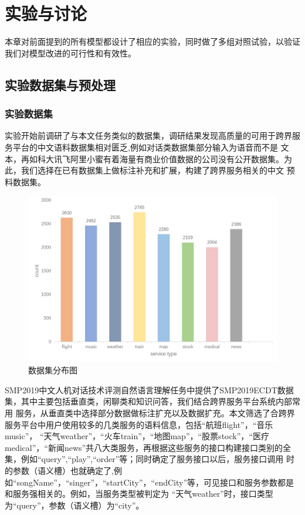 \chapter{实验与讨论}
本章对前面提到的所有模型都设计了相应的实验，同时做了多组对照试验，以验证我们对模型改进的可行性和有效性。

\section{实验数据集与预处理}
\subsection{实验数据集}
实验开始前调研了与本文任务类似的数据集，调研结果发现高质量的可用于跨界服务平台的中文语料数据集相对匮乏,例如对话类数据集部分输入为语音而不是
文本，再如科大讯飞阿里小蜜有着海量有商业价值数据的公司没有公开数据集。为此，我们选择在已有数据集上做标注补充和扩展，构建了跨界服务相关的中文
预料数据集。

\begin{figure}[htbp]
    \centering
    \includegraphics[width=15cm]{./images/count.jpg}
    \caption{数据集分布图}
    \label{fig:count}
  \end{figure}

SMP2019中文人机对话技术评测自然语言理解任务中提供了SMP2019ECDT数据集，其中主要包括垂直类，闲聊类和知识问答，我们结合跨界服务平台系统内部常用
服务，从垂直类中选择部分数据做标注扩充以及数据扩充。本文筛选了合跨界服务平台中用户使用较多的几类服务的语料信息，包括“航班flight”，“音乐music”，
“天气weather”，“火车train”，“地图map”，“股票stock”，“医疗medical”，“新闻news”共八大类服务，再根据这些服务的接口构建接口类别的全集，例如“query”,“play”,“order”等；同时确定了服务接口以后，服务接口调用
时的参数（语义槽）也就确定了,例如“songName”，“singer”，“startCity”，“endCity”等，可见接口和服务参数都是和服务强相关的。例如，当服务类型被判定为
“天气weather”时，接口类型为“query”，参数（语义槽）为“city”。

